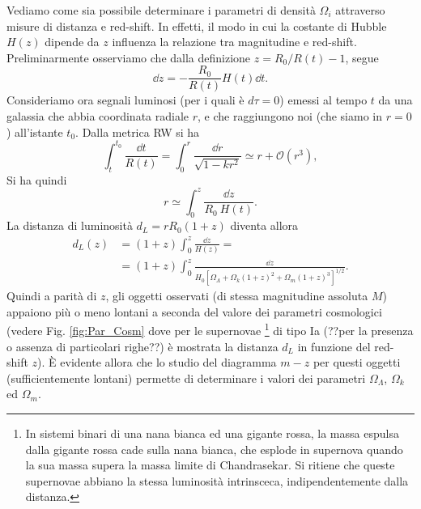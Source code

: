 Vediamo come sia possibile determinare i parametri di densità $\Omega_i$
attraverso misure di distanza e red-shift.  In effetti, il modo in cui la
costante di Hubble $H(z)$ dipende da $z$ influenza la relazione tra magnitudine
e red-shift.  Preliminarmente osserviamo che dalla definizione $z=R_0/R(t) -1$,
segue
\begin{equation}
  \dd z = -\frac {R_0}{R(t)} H(t) \dd t.
\end{equation}
Consideriamo ora segnali luminosi (per i quali è $d \tau=0$) emessi al tempo $t$
da una galassia che abbia coordinata radiale $r$, e che raggiungono noi (che siamo in
$r=0$) all'istante $t_0$.  Dalla metrica RW si ha
\begin{equation}
  \int_t^{t_0} \frac {\dd t}{R(t)}= \int_0^{r} \frac {\dd r}{\sqrt{1-kr^2}}
  \simeq r + \mathcal{O}(r^3),
\end{equation}
Si ha quindi
\begin{equation}
  r \simeq \int_0^z \frac{\dd z}{R_0 ~ H(t)}.
\end{equation}
La distanza di luminosità $d_L = r R_0 (1+z)$ diventa allora
\begin{equation}
  \begin{split}
    d_L(z) & = (1+z) \int_0^z \frac{\dd z}{H(z)} = \\
           & = (1+z) \int_0^z \frac{\dd z}{H_0
             \left[\Omega_{\Lambda}+\Omega_{k}(1+z)^2+\Omega_m
               (1+z)^3\right]^{1/2}}.
  \end{split}
\end{equation}
Quindi a parità di $z$, gli oggetti osservati (di stessa magnitudine assoluta
$M$) appaiono più o meno lontani a seconda del valore dei parametri cosmologici
(vedere Fig. \ref{fig:Par_Cosm} dove per le supernovae \footnote{In sistemi
  binari di una nana bianca ed una gigante rossa, la massa espulsa dalla gigante
  rossa cade sulla nana bianca, che esplode in supernova quando la sua massa
  supera la massa limite di Chandrasekar. Si ritiene che queste supernovae
  abbiano la stessa luminosità intrinsceca, indipendentemente dalla distanza.}
di tipo Ia (??per la presenza o assenza di particolari righe??) è mostrata la
distanza $d_L$ in funzione del red-shift $z$).  È evidente allora che lo studio
del diagramma $m-z$ per questi oggetti (sufficientemente lontani) permette di
determinare i valori dei parametri $\Omega_{\Lambda}$, $\Omega_{k}$ ed
$\Omega_{m}$.


